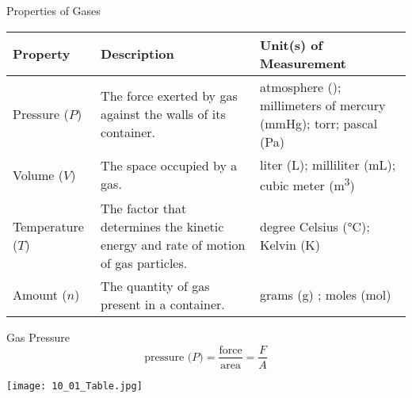 \documentclass[handout]{beamer}
\begin{document}
\begin{frame}{Properties of Gases}
	\begin{center}
	\begin{tabularx}{\linewidth} {l *{2}{>{\raggedright\arraybackslash}X}}
		\toprule
		\bfseries Property & \bfseries Description & \bfseries Unit(s)
		of Measurement \\ \midrule
		Pressure ($P$) & The force exerted by gas against the walls of
		its container. & atmosphere (\si{\atm}); millimeters of mercury
		(\si{\mmHg}); torr; pascal (\si{\pascal}) \\
		Volume ($V$) & The space occupied by a gas. & liter
		(\si{\liter}); milliliter (\si{\milli\liter}); cubic meter
		(\si{\meter\cubed}) \\
		Temperature ($T$) & The factor that determines the kinetic
		energy and rate of motion of gas particles. & degree Celsius
		(\si{\celsius}); Kelvin (\si{\kelvin}) \\
		Amount ($n$) & The quantity of gas present in a container. &
		grams (\si{\gram}) ; moles (\si{\mole}) \\ \bottomrule
	\end{tabularx}
	\end{center}
\end{frame}

\begin{frame}{Gas Pressure}
		\begin{equation*}
			\text{pressure ($P$)} =
			\frac{\text{force}}{\text{area}} = \frac{F}{A}
		\end{equation*}

		\vspace{-2em}

	\begin{center}
	\end{center}
\end{frame}

\begin{frame}
	\begin{center}
		\texttt{[image: 10\_01\_Table.jpg]}
	\end{center}
\end{frame}
\end{document}
